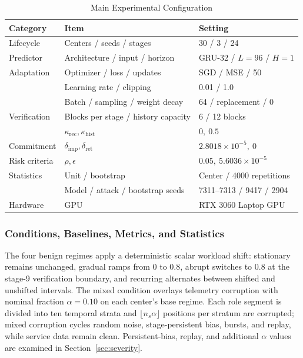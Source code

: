 \begin{table}[t]
\centering
\caption{Main Experimental Configuration}
\label{tab:configuration}
\scriptsize
\begin{tabular}{lll}
\toprule
Category & Item & Setting \\
\midrule
Lifecycle & Centers / seeds / stages & 30 / 3 / 24 \\
Predictor & Architecture / input / horizon & GRU-32 / $L=96$ / $H=1$ \\
Adaptation & Optimizer / loss / updates & SGD / MSE / 50 \\
 & Learning rate / clipping & 0.01 / 1.0 \\
 & Batch / sampling / weight decay & 64 / replacement / 0 \\
Verification & Blocks per stage / history capacity & 6 / 12 blocks \\
 & $\kappa_{\mathrm{rec}},\kappa_{\mathrm{hist}}$ & $0,\ 0.5$ \\
Commitment & $\delta_{\mathrm{imp}},\delta_{\mathrm{ret}}$ & $2.8018\!\times\!10^{-5},\ 0$ \\
Risk criteria & $\rho,\epsilon$ & $0.05,\ 5.6036\!\times\!10^{-5}$ \\
Statistics & Unit / bootstrap & Center / 4000 repetitions \\
 & Model / attack / bootstrap seeds & 7311--7313 / 9417 / 2904 \\
Hardware & GPU & RTX 3060 Laptop GPU \\
\bottomrule
\end{tabular}
\end{table}

\subsubsection{Conditions, Baselines, Metrics, and Statistics}
The four benign regimes apply a deterministic scalar workload shift: stationary remains unchanged, gradual ramps from 0 to 0.8, abrupt switches to 0.8 at the stage-9 verification boundary, and recurring alternates between shifted and unshifted intervals. The mixed condition overlays telemetry corruption with nominal fraction $\alpha=0.10$ on each center's base regime. Each role segment is divided into ten temporal strata and $\lfloor n_s\alpha\rfloor$ positions per stratum are corrupted; mixed corruption cycles random noise, stage-persistent bias, bursts, and replay, while service data remain clean. Persistent-bias, replay, and additional $\alpha$ values are examined in Section~\ref{sec:severity}.

